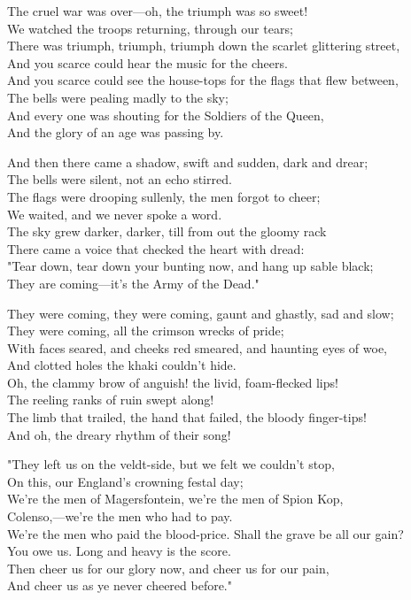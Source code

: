 
\begin{poemblock}
The cruel war was over—oh, the triumph was so sweet!\\
\idt We watched the troops returning, through our tears;\\
There was triumph, triumph, triumph down the scarlet glittering street,\\
\idt And you scarce could hear the music for the cheers.\\
And you scarce could see the house-tops for the flags that flew between,\\
\idt The bells were pealing madly to the sky;\\
And every one was shouting for the Soldiers of the Queen,\\
\idt And the glory of an age was passing by.

And then there came a shadow, swift and sudden, dark and drear;\\
\idt The bells were silent, not an echo stirred.\\
The flags were drooping sullenly, the men forgot to cheer;\\
\idt We waited, and we never spoke a word.\\
The sky grew darker, darker, till from out the gloomy rack\\
\idt There came a voice that checked the heart with dread:\\
"Tear down, tear down your bunting now, and hang up sable black;\\
\idt They are coming—it's the Army of the Dead."

They were coming, they were coming, gaunt and ghastly, sad and slow;\\
\idt They were coming, all the crimson wrecks of pride;\\
With faces seared, and cheeks red smeared, and haunting eyes of woe,\\
\idt And clotted holes the khaki couldn't hide.\\
Oh, the clammy brow of anguish! the livid, foam-flecked lips!\\
\idt The reeling ranks of ruin swept along!\\
The limb that trailed, the hand that failed, the bloody finger-tips!\\
\idt And oh, the dreary rhythm of their song!

"They left us on the veldt-side, but we felt we couldn't stop,\\
\idt On this, our England's crowning festal day;\\
We're the men of Magersfontein, we're the men of Spion Kop,\\
\idt Colenso,—we're the men who had to pay.\\
We're the men who paid the blood-price. Shall the grave be all our gain?\\
\idt You owe us. Long and heavy is the score.\\
Then cheer us for our glory now, and cheer us for our pain,\\
\idt And cheer us as ye never cheered before."


\end{poemblock}
